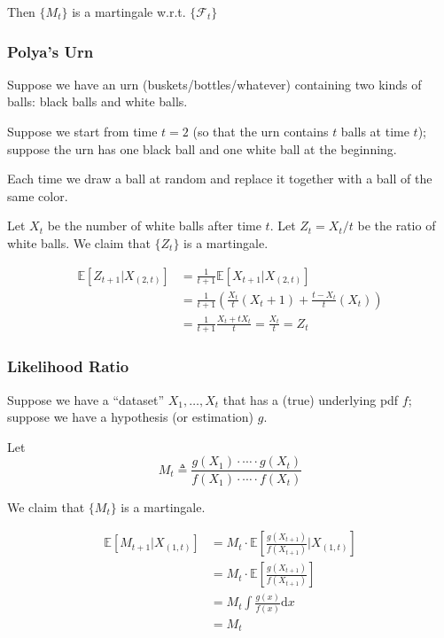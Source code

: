         Then $\{M_t\}$ is a martingale w.r.t. $\{\mathcal{F}_t\}$

        \subsubsection{Polya's Urn}
        Suppose we have an urn (buskets/bottles/whatever) containing two kinds of balls: black balls and white balls.
        
        Suppose we start from time $t=2$ (so that the urn contains $t$ balls at time $t$); suppose the urn has one black ball and one white ball at the beginning.
        
        Each time we draw a ball at random and replace it together with a ball of the same color.

        Let $X_t$ be the number of white balls after time $t$. Let $Z_t = X_t/t$ be the ratio of white balls. We claim that $\{Z_t\}$ is a martingale.

        \begin{align*}
            \mathbb{E}\left[Z_{t+1}|X_{(2,t)}\right] &= \frac{1}{t+1}\mathbb{E}[X_{t+1}|X_{(2,t)}]\\
            &= \frac{1}{t+1}\left(\frac{X_t}{t}\left(X_t+1\right) + \frac{t-X_t}{t}\left(X_t\right)\right)\\
            &= \frac{1}{t+1}\frac{X_t + tX_t}{t} = \frac{X_t}{t} = Z_t
        \end{align*}

        \subsubsection{Likelihood Ratio}
        Suppose we have a ``dataset'' $X_1,\dots,X_t$ that has a (true) underlying pdf $f$; suppose we have a hypothesis (or estimation) $g$.

        Let 
        \[ M_t \triangleq \frac{g(X_1)\cdot \cdots \cdot g(X_t)}{f(X_1)\cdot \cdots \cdot f(X_t)} \]

        We claim that $\{M_t\}$ is a martingale.

        \begin{align*}
            \mathbb{E}[M_{t+1}|X_{(1,t)}] &= M_t\cdot\mathbb{E}\left[\frac{g(X_{t+1})}{f(X_{t+1})}|X_{(1,t)}\right]\\
            &= M_t \cdot \mathbb{E}\left[\frac{g(X_{t+1})}{f(X_{t+1})}\right]\\
            &= M_t \int \frac{g(x)}{f(x)}\mathrm{d}x \\
            &= M_t
        \end{align*}


